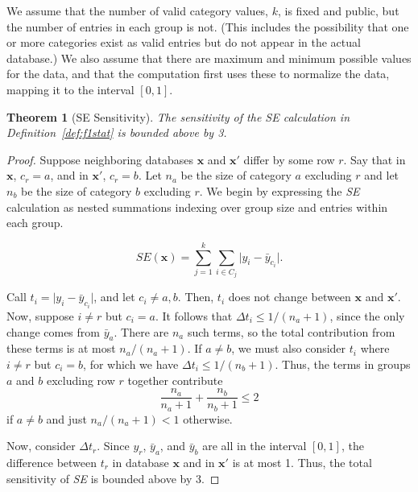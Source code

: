 \documentclass[USenglish,oneside]{article}
\newcounter{ab}
\newcounter{ar}
\newcounter{igh}
\newcounter{ms}
\newtheorem{theorem}{Theorem}
\renewcommand{\k}{\ensuremath{k}\xspace}
\newcommand{\se}{\textit{SE}\xspace}
\newcommand{\x}{\ensuremath{\mathbf{x}}\xspace}
\newcommand{\xprime}{\ensuremath{\mathbf{x'}}\xspace}
\begin{document}
We assume that the number of valid category values, \k, is fixed and public, but the number of entries in each group is not.  (This includes the possibility that one or more categories exist as valid entries but do not appear in the actual database.)   We also assume that there are maximum and minimum possible values for the data, and that the computation first uses these to normalize the data, mapping it to the interval $[0,1]$.

\begin{theorem}[SE Sensitivity] \label{thm:SEsens}
The sensitivity of the \se calculation in Definition~\ref{def:f1stat} is bounded above by 3.
\end{theorem}

\begin{proof}

Suppose neighboring databases \x and \xprime differ by some row $r$.
Say that in \x, $c_r = a$, and in \xprime, $c_r = b$. 
Let $n_a$ be the size of category $a$ excluding $r$ and let $n_b$ be the size of category $b$ excluding $r$. We begin by expressing the \se calculation as nested summations indexing over group size and entries within each group.

$$ \se(\x) = \sum_{j=1}^k \sum_{i \in C_j}  \lvert y_{i} - \bar{y}_{c_i} \rvert. $$

Call $t_{i} = \lvert y_{i} - \bar{y}_{c_i} \rvert$, and let $c_i \neq a,b$. Then, $t_{i}$ does not change between \x and \xprime. Now, suppose $i \ne r$ but $c_i = a$. It follows that $\Delta t_{i} \le 1/(n_a+1)$, since the only change comes from $\bar{y}_{a}$. There are $n_a$ such terms, so the total contribution from these terms is at most $n_a/(n_a+1)$. If $a \neq b$, we must also consider $t_{i}$ where $i \ne r$ but $c_i = b$, for which we have $\Delta t_{i} \le 1/(n_b+1)$. Thus, the terms in groups $a$ and $b$ excluding row $r$ together contribute 
$$ \frac{n_a}{n_a+1} + \frac{n_b}{n_b+1} \leq 2$$
if $a \neq b$ and just $n_a / (n_a+1) < 1$ otherwise.

Now, consider $\Delta t_{r}$. Since $y_{r}$, $\bar{y}_{a}$, and $\bar{y}_b$ are all in the interval $[0,1]$, the difference between $t_{r}$ in database \x and in \xprime is at most 1. Thus, the total sensitivity of \se is bounded above by 3.

\end{proof}
\end{document}
